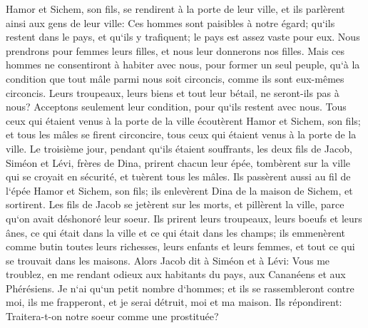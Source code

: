 \verse Hamor et Sichem, son fils, se rendirent à la porte de leur ville, et ils parlèrent ainsi aux gens de leur ville: 
\verse Ces hommes sont paisibles à notre égard; qu`ils restent dans le pays, et qu`ils y trafiquent; le pays est assez vaste pour eux. Nous prendrons pour femmes leurs filles, et nous leur donnerons nos filles. 
\verse Mais ces hommes ne consentiront à habiter avec nous, pour former un seul peuple, qu`à la condition que tout mâle parmi nous soit circoncis, comme ils sont eux-mêmes circoncis. 
\verse Leurs troupeaux, leurs biens et tout leur bétail, ne seront-ils pas à nous? Acceptons seulement leur condition, pour qu`ils restent avec nous. 
\verse Tous ceux qui étaient venus à la porte de la ville écoutèrent Hamor et Sichem, son fils; et tous les mâles se firent circoncire, tous ceux qui étaient venus à la porte de la ville. 
\verse Le troisième jour, pendant qu`ils étaient souffrants, les deux fils de Jacob, Siméon et Lévi, frères de Dina, prirent chacun leur épée, tombèrent sur la ville qui se croyait en sécurité, et tuèrent tous les mâles. 
\verse Ils passèrent aussi au fil de l`épée Hamor et Sichem, son fils; ils enlevèrent Dina de la maison de Sichem, et sortirent. 
\verse Les fils de Jacob se jetèrent sur les morts, et pillèrent la ville, parce qu`on avait déshonoré leur soeur. 
\verse Ils prirent leurs troupeaux, leurs boeufs et leurs ânes, ce qui était dans la ville et ce qui était dans les champs; 
\verse ils emmenèrent comme butin toutes leurs richesses, leurs enfants et leurs femmes, et tout ce qui se trouvait dans les maisons. 
\verse Alors Jacob dit à Siméon et à Lévi: Vous me troublez, en me rendant odieux aux habitants du pays, aux Cananéens et aux Phérésiens. Je n`ai qu`un petit nombre d`hommes; et ils se rassembleront contre moi, ils me frapperont, et je serai détruit, moi et ma maison. 
\verse Ils répondirent: Traitera-t-on notre soeur comme une prostituée? 

